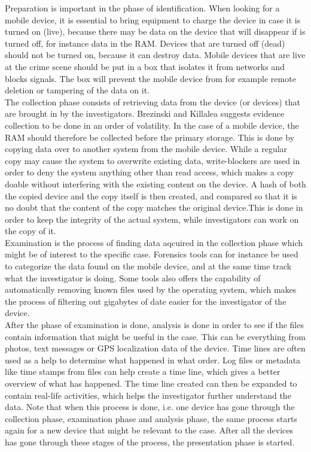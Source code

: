 Preparation is important in the phase of identification. When looking for a mobile device, it is essential to bring equipment to charge the device in case it is turned on (live), because there may be data on the device that will disappear if is turned off, for instance data in the RAM. Devices that are turned off (dead) should not be turned on, because it can destroy data. Mobile devices that are live at the crime scene should be put in a box that isolates it from networks and blocks signals. The box will prevent the mobile device from for example remote deletion or tampering of the data on it\cite{DiFoBook}. \\

The collection phase consists of retrieving data from the device (or devices) that are brought in by the investigators\cite{DiFoBook}. Brezinski and Killalea\cite{RFC3227} suggests evidence collection to be done in an order of volatility. In the case of a mobile device, the RAM should therefore be collected before the primary storage. This is done by copying data over to another system from the mobile device. While a regular copy may cause the system to overwrite existing data, write-blockers are used in order to deny the system anything other than read access, which makes a copy doable without interfering with the existing content on the device. A hash of both the copied device and the copy itself is then created, and compared so that it is no doubt that the content of the copy matches the original device\cite{DiFoBook}.This is done in order to keep the integrity of the actual system, while investigators can work on the copy of it. \\

Examination is the process of finding data aqcuired in the collection phase which might be of interest to the specific case. Forensics tools can for instance be used to categorize the data found on the mobile device, and at the same time track what the investigator is doing. Some tools also offers the capability of automatically removing known files used by the operating system, which makes the process of filtering out gigabytes of date easier for the investigator of the device.\\

After the phase of examination is done, analysis is done in order to see if the files contain information that might be useful in the case. This can be everything from photos, text messages or GPS localization data of the device. Time lines are often used as a help to determine what happened in what order. Log files or metadata like time stamps from files can help create a time line, which gives a better overview of what has happened. The time line created can then be expanded to contain real-life activities, which helps the investigator further understand the data. Note that when this process is done, i.e. one device has gone through the collection phase, examination phase and analysis phase, the same process starts again for a new device that might be relevant to the case. After all the devices has gone through these stages of the process, the presentation phase is started.\\

